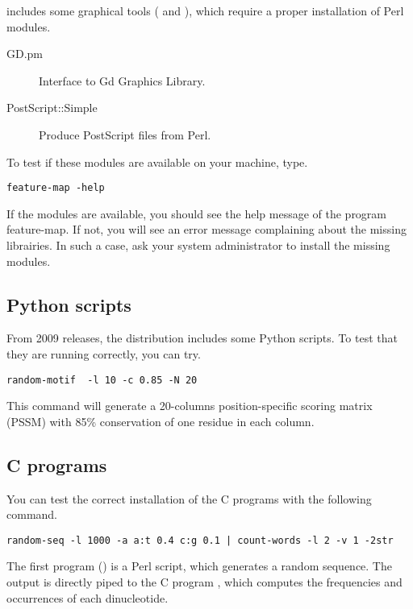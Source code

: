 \documentclass[12pt,a4paper, oneside]{scrreprt} %
\begin{document}
\RSAT includes some graphical tools ( and
), which require a proper installation of Perl
modules.

\begin{description}
\item[GD.pm] Interface to Gd Graphics Library.
\item[PostScript::Simple]  Produce PostScript files from Perl.
\end{description}

To test if these modules are available on your machine, type.

\begin{lstlisting}
feature-map -help
\end{lstlisting}

If the modules are available, you should see the help message of the
program feature-map. If not, you will see an error message complaining
about the missing librairies. In such a case, ask your system
administrator to install the missing modules.

\subsection{Python scripts}

From 2009 releases, the \RSAT distribution includes some Python
scripts. To test that they are running correctly, you can try.

\begin{lstlisting}
random-motif  -l 10 -c 0.85 -N 20
\end{lstlisting}

This command will generate a 20-columns position-specific scoring
matrix (PSSM) with 85\% conservation of one residue in each column.

\subsection{C programs}

You can test the correct installation of the C programs with the
following command.

\begin{lstlisting}
random-seq -l 1000 -a a:t 0.4 c:g 0.1 | count-words -l 2 -v 1 -2str
\end{lstlisting}

The first program () is a Perl script, which
generates a random sequence. The output is directly piped to the C
program , which computes the frequencies and
occurrences of each dinucleotide.
\end{document}
